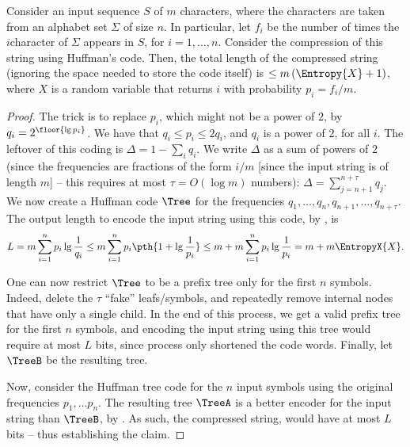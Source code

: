 \begin{theorem}
    Consider an input sequence $S$ of $m$ characters, where the
    characters are taken from an alphabet set $\Sigma$ of size $n$. In
    particular, let $f_i$ be the number of times the $i$\th character
    of $\Sigma$ appears in $S$, for $i=1,\ldots, n$. Consider the
    compression of this string using Huffman's code. Then, the total
    length of the compressed string (ignoring the space needed to
    store the code itself) is $\leq m \,(\Entropy{X} + 1)$, where $X$
    is a random variable that returns $i$ with probability
    $p_i = f_i/m$.
\end{theorem}
\begin{proof}
    The trick is to replace $p_i$, which might not be a power of $2$,
    by $q_i = 2^{\floor{\lg p_i }}$. We have that
    $q_i \leq p_i \leq 2q_i$, and $q_i$ is a power of $2$, for all
    $i$. The leftover of this coding is $\Delta = 1 - \sum_i q_i$. We
    write $\Delta$ as a sum of powers of $2$ (since the frequencies
    are fractions of the form $i/m$ [since the input string is of
    length $m$] -- this requires at most $\tau = O(\log m)$ numbers):
    $\Delta = \sum_{j=n+1}^{n+\tau}q_j$. We now create a Huffman code
    $\Tree$ for the frequencies
    ${q_1, \ldots, q_n, q_{n+1}, \ldots, q_{n+\tau}}$. The output
    length to encode the input string using this code, by
    , is
    \begin{equation*}
        L%
        =%
        m \sum_{i=1}^n p_i \lg \frac{1}{q_i}
        \leq %
        m \sum_{i=1}^n p_i \pth{ 1 + \lg \frac{1}{p_i}}
        \leq %
        m + m \sum_{i=1}^n p_i  \lg \frac{1}{p_i}%
        =%
        m + m \EntropyX{X}.
    \end{equation*}

    One can now restrict $\Tree$ to be a prefix tree only for the
    first $n$ symbols. Indeed, delete the $\tau$ ``fake''
    leafs/symbols, and repeatedly remove internal nodes that have only
    a single child. In the end of this process, we get a valid prefix
    tree for the first $n$ symbols, and encoding the input string
    using this tree would require at most $L$ bits, since process only
    shortened the code words. Finally, let $\TreeB$ be the resulting
    tree.

    Now, consider the Huffman tree code for the $n$ input symbols
    using the original frequencies $p_1,\ldots p_n$. The resulting
    tree $\TreeA$ is a better encoder for the input string than
    $\TreeB$, by . As such, the compressed
    string, would have at most $L$ bits -- thus establishing the
    claim.
\end{proof}




